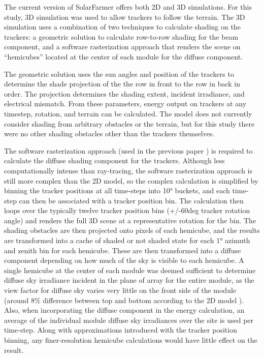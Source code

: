 \documentclass[conference]{IEEEtran}
\begin{document}
The current version of SolarFarmer offers both 2D and 3D simulations. For this study, 3D simulation was used to allow trackers to follow the terrain. The 3D simulation uses a combination of two techniques to calculate shading on the trackers: a geometric solution to calculate row-to-row shading for the beam component, and a software rasterization approach that renders the scene on “hemicubes” located at the center of each module for the diffuse component. 

The geometric solution uses the sun angles and position of the trackers to determine the shade projection of the the row in front to the row in back in order. The projection determines the shading extent, incident irradiance, and electrical mismatch. From these parameters,  energy output on trackers at any timestep, rotation, and terrain can be calculated. The model does not currently consider shading from arbitrary obstacles or the terrain, but for this study there were no other shading obstacles other than the trackers themselves.

The software rasterization approach (used in the previous paper \cite{Mikofski_9300381}) is required to calculate the diffuse shading component for the trackers. Although less computationally intense than ray-tracing, the software rasterization approach is still more complex than the 2D model, so the complex calculation is simplified by binning the tracker positions at all time-steps into 10° buckets, and each time-step can then be associated with a tracker position bin. The calculation then loops over the typically twelve tracker position bins (+/-60deg tracker rotation angle) and renders the full 3D scene at a representative rotation for the bin. The shading obstacles are then projected onto pixels of each hemicube, and the results are transformed into a cache of shaded or not shaded state for each 1° azimuth and zenith bin for each hemicube. These are then transformed into a diffuse component depending on how much of the sky is visible to each hemicube. A single hemicube at the center of each module was deemed sufficient to determine diffuse sky irradiance incident in the plane of array for the entire module, as the view factor for diffuse sky varies very little on the front side of the module (around 8\% difference between top and bottom according to the 2D model \cite{Mikofski_8980572}). Also, when incorporating the diffuse component in the energy calculation, an average of the individual module diffuse sky irradiances over the site is used per time-step. Along with approximations introduced with the tracker position binning, any finer-resolution hemicube calculations would have little effect on the result.
\end{document}
